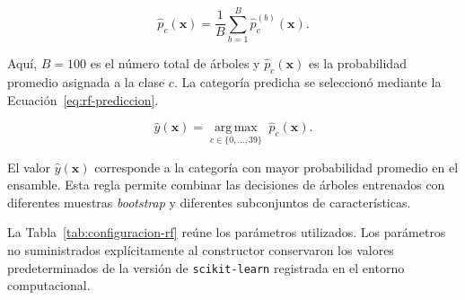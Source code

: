 \begin{equation}
\widehat p_c(\mathbf x)
=
\frac{1}{B}
\sum_{b=1}^{B}
\widehat p_c^{(b)}(\mathbf x).
\label{eq:rf-probabilidad-bosque}
\end{equation}

Aquí, $B=100$ es el número total de árboles y $\widehat p_c(\mathbf x)$ es la probabilidad promedio asignada a la clase $c$. La categoría predicha se seleccionó mediante la Ecuación~\eqref{eq:rf-prediccion}.

\begin{equation}
\widehat y(\mathbf x)
=
\underset{c\in\{0,\ldots,39\}}
{\operatorname{arg\,max}}
\;
\widehat p_c(\mathbf x).
\label{eq:rf-prediccion}
\end{equation}

El valor $\widehat y(\mathbf x)$ corresponde a la categoría con mayor probabilidad promedio en el ensamble. Esta regla permite combinar las decisiones de árboles entrenados con diferentes muestras \textit{bootstrap} y diferentes subconjuntos de características.

La Tabla~\ref{tab:configuracion-rf} reúne los parámetros utilizados. Los parámetros no suministrados explícitamente al constructor conservaron los valores predeterminados de la versión de \texttt{scikit-learn} registrada en el entorno computacional.


